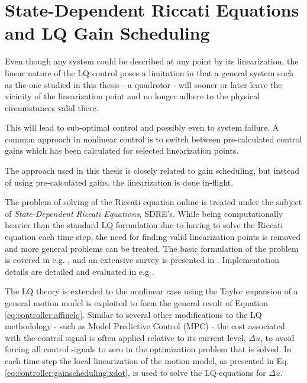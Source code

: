 \section{State-Dependent Riccati Equations and LQ Gain Scheduling}
\label{sec:controller:gainscheduling}
    Even though any system could be described at any point by its linearization,
    the linear nature of the LQ control poses a limitation in that
    a general system such as the one studied in this thesis - a quadrotor - will
    sooner or later leave the vicinity of the linearization point and no
    longer adhere to the physical circumstances valid there.

    This will lead to sub-optimal control and possibly even to system failure.
    A common approach in nonlinear control is to switch between pre-calculated
    control gains which has been calculated for selected linearization points.

    The approach used in this thesis is closely related to gain scheduling,
    but instead of using pre-calculated gains, the linearization is done
    in-flight.

    The problem of solving of the Riccati equation  online is treated under
    the subject of \textit{State-Dependent Riccati Equations}, SDRE's.
    While being computationally heavier than the standard LQ formulation
    due to having to solve the Riccati equation each time step, the need
    for finding valid linearization points is removed and more general problems can be treated.
    The basic formulation of the problem is covered in e.g. \citep{Rantzer99piecewiselinear},
    and an extensive survey is presented in \citep{Tayfun08sdresurvey}.
    Implementation details are detailed and evaluated in e.g \citep{Erdem_analysisand,Benner98acceleratingnewton's,10.1109/MED.2006.328740}.

    The LQ theory is extended to the nonlinear case using the Taylor
    expansion of a general motion model is exploited to form the general
    result of Equation \eqref{eq:controller:affinelq}.
    Similar to several other modifications to the LQ methodology - such as
    Model Predictive Control (MPC) - the cost associated with the control signal
    is often applied relative to its current level, $\Delta u$, to avoid
    forcing all control signals to zero in the optimization problem that is solved.
    In each time-step the local linearization of the motion model, as presented in
    Eq. \eqref{eq:controller:gainscheduling:xdot}, is used to solve the LQ-equations for $\Delta u$.

